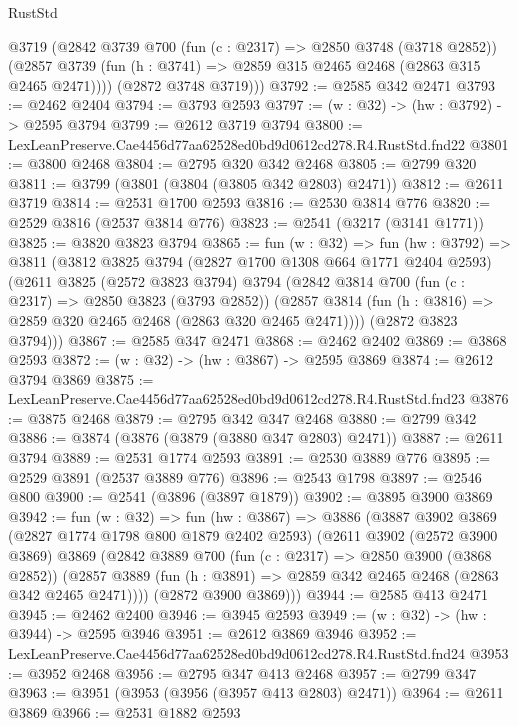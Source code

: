\begin{lexlean}{RustStd}
\begin{coremodule}
        @3719
        (@2842
          @3739
          @700
          (fun (c : @2317) => @2850 @3748 (@3718 @2852))
          (@2857 @3739 (fun (h : @3741) => @2859 @315 @2465 @2468 (@2863 @315 @2465 @2471))))
        (@2872 @3748 @3719)))
@3792 := @2585 @342 @2471
@3793 := @2462 @2404
@3794 := @3793 @2593
@3797 := (w : @32) -> (hw : @3792) -> @2595 @3794
@3799 := @2612 @3719 @3794
@3800 := LexLeanPreserve.Cae4456d77aa62528ed0bd9d0612cd278.R4.RustStd.fnd22
@3801 := @3800 @2468
@3804 := @2795 @320 @342 @2468
@3805 := @2799 @320
@3811 := @3799 (@3801 (@3804 (@3805 @342 @2803) @2471))
@3812 := @2611 @3719
@3814 := @2531 @1700 @2593
@3816 := @2530 @3814 @776
@3820 := @2529 @3816 (@2537 @3814 @776)
@3823 := @2541 (@3217 (@3141 @1771))
@3825 := @3820 @3823 @3794
@3865 := fun (w : @32) =>
  fun (hw : @3792) =>
  @3811
    (@3812
      @3825
      @3794
      (@2827 @1700 @1308 @664 @1771 @2404 @2593)
      (@2611
        @3825
        (@2572 @3823 @3794)
        @3794
        (@2842
          @3814
          @700
          (fun (c : @2317) => @2850 @3823 (@3793 @2852))
          (@2857 @3814 (fun (h : @3816) => @2859 @320 @2465 @2468 (@2863 @320 @2465 @2471))))
        (@2872 @3823 @3794)))
@3867 := @2585 @347 @2471
@3868 := @2462 @2402
@3869 := @3868 @2593
@3872 := (w : @32) -> (hw : @3867) -> @2595 @3869
@3874 := @2612 @3794 @3869
@3875 := LexLeanPreserve.Cae4456d77aa62528ed0bd9d0612cd278.R4.RustStd.fnd23
@3876 := @3875 @2468
@3879 := @2795 @342 @347 @2468
@3880 := @2799 @342
@3886 := @3874 (@3876 (@3879 (@3880 @347 @2803) @2471))
@3887 := @2611 @3794
@3889 := @2531 @1774 @2593
@3891 := @2530 @3889 @776
@3895 := @2529 @3891 (@2537 @3889 @776)
@3896 := @2543 @1798
@3897 := @2546 @800
@3900 := @2541 (@3896 (@3897 @1879))
@3902 := @3895 @3900 @3869
@3942 := fun (w : @32) =>
  fun (hw : @3867) =>
  @3886
    (@3887
      @3902
      @3869
      (@2827 @1774 @1798 @800 @1879 @2402 @2593)
      (@2611
        @3902
        (@2572 @3900 @3869)
        @3869
        (@2842
          @3889
          @700
          (fun (c : @2317) => @2850 @3900 (@3868 @2852))
          (@2857 @3889 (fun (h : @3891) => @2859 @342 @2465 @2468 (@2863 @342 @2465 @2471))))
        (@2872 @3900 @3869)))
@3944 := @2585 @413 @2471
@3945 := @2462 @2400
@3946 := @3945 @2593
@3949 := (w : @32) -> (hw : @3944) -> @2595 @3946
@3951 := @2612 @3869 @3946
@3952 := LexLeanPreserve.Cae4456d77aa62528ed0bd9d0612cd278.R4.RustStd.fnd24
@3953 := @3952 @2468
@3956 := @2795 @347 @413 @2468
@3957 := @2799 @347
@3963 := @3951 (@3953 (@3956 (@3957 @413 @2803) @2471))
@3964 := @2611 @3869
@3966 := @2531 @1882 @2593

\end{coremodule}
\end{lexlean}
